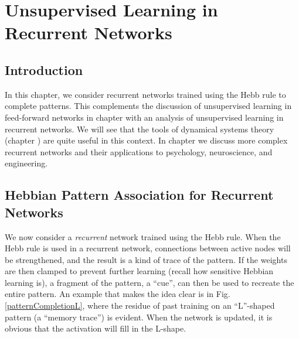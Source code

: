 \chapter{Unsupervised Learning in Recurrent Networks}\label{ch_unsupervised_recurrent}


\section{Introduction}

In this chapter, we consider recurrent networks trained using the Hebb rule to complete patterns. This complements the discussion of unsupervised learning in feed-forward networks in chapter  with an analysis of unsupervised learning in recurrent networks. We will see that the tools of dynamical systems theory (chapter ) are quite useful in this context. In chapter  we discuss more complex recurrent networks and their applications to psychology, neuroscience, and engineering.
  
\section{Hebbian Pattern Association for Recurrent Networks}

We now consider a \emph{recurrent} network trained using the Hebb rule. When the Hebb rule is used in a recurrent network, connections between active nodes will be strengthened, and the result is a kind of trace of the pattern. If the weights are then clamped to prevent further learning (recall how sensitive Hebbian learning is), a fragment of the pattern, a ``cue'', can then be used to recreate the entire pattern. An example that makes the idea clear is in Fig. \ref{patternCompletionL}, where the residue of past training on an ``L''-shaped pattern (a ``memory trace'') is evident. When the network is updated, it is obvious that the activation will fill in the L-shape. 

